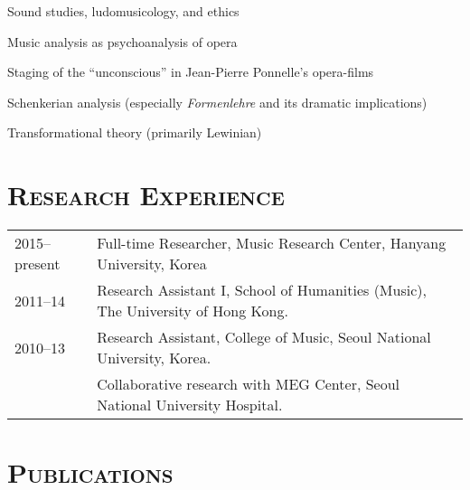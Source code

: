 \documentclass[a4paper,11pt]{article}
\begin{document}
  \hspace{2mm} \textbullet \hspace{2mm} Sound studies, ludomusicology, and ethics
  
  \noindent \hspace{2mm} \textbullet \hspace{2mm} Music analysis as psychoanalysis of opera
   
  \noindent \hspace{2mm} \textbullet \hspace{2mm} Staging of the ``unconscious'' in Jean-Pierre Ponnelle's opera-films
  
  \noindent \hspace{2mm} \textbullet \hspace{2mm} Schenkerian analysis (especially \textit{Formenlehre} and its dramatic implications)
  
  \noindent \hspace{2mm} \textbullet \hspace{2mm} Transformational theory (primarily Lewinian)
  
  \section*{\textsc{Research Experience}}
  
  \hspace*{-0.25cm}
  \begin{tabular}{p{2.5cm} l}
    2015--present & Full-time Researcher, Music Research Center, Hanyang University, Korea\\
    
    2011--14 & Research Assistant I, School of Humanities (Music), The University of Hong Kong.\\
    
    2010--13 & Research Assistant, College of Music, Seoul National University, Korea.\\
    & Collaborative research with MEG Center, Seoul National University Hospital.
  \end{tabular}
  
  \vspace*{2.5mm}
  
  \section*{\textsc{Publications}}
\end{document}
